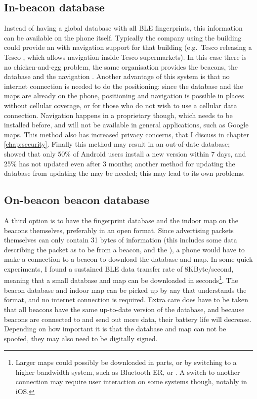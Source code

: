 \subsection{In-\app beacon database}
Instead of having a global database with all BLE fingerprints, this information can be available on the phone itself.
Typically the company using the building could provide an \app with navigation support for that building (e.g.\ Tesco releasing a Tesco \app, which allows navigation inside Tesco supermarkets).
In this case there is no chicken-and-egg problem, the same organisation provides the beacons, the database and the navigation \app.
Another advantage of this system is that no internet connection is needed to do the positioning: since the database and the maps are already on the phone, positioning and navigation is possible in places without cellular coverage, or for those who do not wish to use a cellular data connection.
Navigation happens in a proprietary \app though, which needs to be installed before, and will not be available in general applications, such as Google maps.
This method also has increased privacy concerns, that I discuss in chapter \ref{chap:security}.
Finally this method may result in an out-of-date database; \citet{moller2012update} showed that only 50\% of Android users install a new \app version within 7 days, and 25\% has not updated even after 3 months; another method for updating the database from updating the \app may be needed; this may lead to its own problems.

\subsection{On-beacon beacon database}
A third option is to have the fingerprint database and the indoor map on the beacons themselves, preferably in an open format.
Since advertising packets themselves can only contain 31 bytes of information (this includes some data describing the packet as to be from a beacon, and the \bid), a phone would have to make a connection to a beacon to download the database and map.
In some quick experiments, I found a sustained BLE data transfer rate of 8KByte/second, meaning that a small database and map can be downloaded in seconds\footnote{Larger maps could possibly be downloaded in parts, or by switching to a higher bandwidth system, such as Bluetooth ER, or \wifi. A switch to another connection may require user interaction on some systems though, notably in iOS.}.
The beacon database and indoor map can be picked up by any \app that understands the format, and no internet connection is required.
Extra care does have to be taken that all beacons have the same up-to-date version of the database, and because beacons are connected to and send out more data, their battery life will decrease.
Depending on how important it is that the database and map can not be spoofed, they may also need to be digitally signed.

